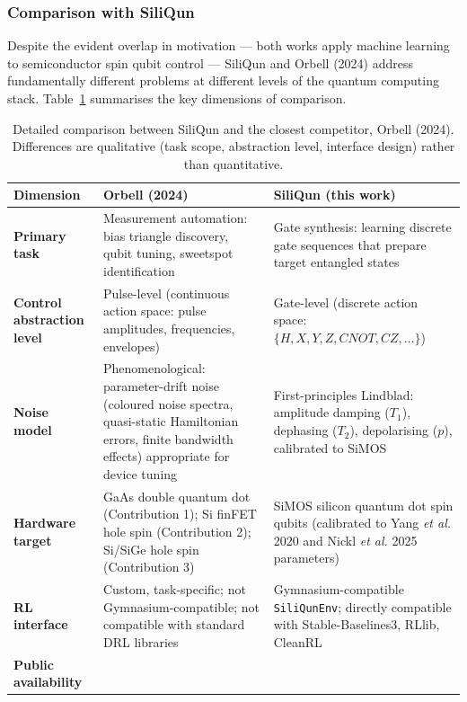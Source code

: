 \subsubsection{Comparison with SiliQun}

Despite the evident overlap in motivation — both works apply machine
learning to semiconductor spin qubit control — SiliQun and Orbell (2024)
address fundamentally different problems at different levels of the quantum
computing stack. Table~\ref{tab:oxford_comparison_rw} summarises the key
dimensions of comparison.

\begin{table}[ht]
\centering
\caption{Detailed comparison between SiliQun and the closest competitor,
Orbell (2024). Differences are qualitative (task scope, abstraction level,
interface design) rather than quantitative.}
\label{tab:oxford_comparison_rw}
\small
\begin{tabular}{p{3.8cm}p{5.2cm}p{5.2cm}}
\toprule
\textbf{Dimension} & \textbf{Orbell (2024)} & \textbf{SiliQun (this work)} \\
\midrule
\textbf{Primary task} &
  Measurement automation: bias triangle discovery, qubit tuning, sweetspot identification &
  Gate synthesis: learning discrete gate sequences that prepare target entangled states \\
\addlinespace
\textbf{Control abstraction level} &
  Pulse-level (continuous action space: pulse amplitudes, frequencies, envelopes) &
  Gate-level (discrete action space: $\{H, X, Y, Z, CNOT, CZ, \ldots\}$) \\
\addlinespace
\textbf{Noise model} &
  Phenomenological: parameter-drift noise (coloured noise spectra, quasi-static Hamiltonian errors, finite bandwidth effects) appropriate for device tuning &
  First-principles Lindblad: amplitude damping ($T_1$), dephasing ($T_2$), depolarising ($p$), calibrated to SiMOS \\
\addlinespace
\textbf{Hardware target} &
  GaAs double quantum dot (Contribution 1); Si finFET hole spin (Contribution 2); Si/SiGe hole spin (Contribution 3) &
  SiMOS silicon quantum dot spin qubits (calibrated to Yang \emph{et al.} 2020 and Nickl \emph{et al.} 2025 parameters) \\
\addlinespace
\textbf{RL interface} &
  Custom, task-specific; not Gymnasium-compatible; not compatible with standard DRL libraries &
  Gymnasium-compatible \texttt{SiliQunEnv}; directly compatible with Stable-Baselines3, RLlib, CleanRL \\
\addlinespace
\textbf{Public availability} &

\end{tabular}
\end{table}
